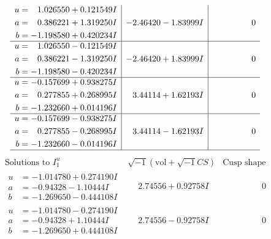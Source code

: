 \documentclass[1p]{elsarticle_modified}
\theoremstyle{definition}
\newcommand{\I}{\sqrt{-1}}
\begin{document}
$$\begin{array}{c|c|c}
\begin{aligned}
u &= \phantom{-}1.026550 + 0.121549 I \\
a &= \phantom{-}0.386221 + 1.319250 I \\
b &= -1.198580 + 0.420234 I\end{aligned}
 & -2.46420 - 1.83999 I & \phantom{-0.000000 } 0 \\ \hline\begin{aligned}
u &= \phantom{-}1.026550 - 0.121549 I \\
a &= \phantom{-}0.386221 - 1.319250 I \\
b &= -1.198580 - 0.420234 I\end{aligned}
 & -2.46420 + 1.83999 I & \phantom{-0.000000 } 0 \\ \hline\begin{aligned}
u &= -0.157699 + 0.938275 I \\
a &= \phantom{-}0.277855 + 0.268995 I \\
b &= -1.232660 + 0.014196 I\end{aligned}
 & \phantom{-}3.44114 + 1.62193 I & \phantom{-0.000000 } 0 \\ \hline\begin{aligned}
u &= -0.157699 - 0.938275 I \\
a &= \phantom{-}0.277855 - 0.268995 I \\
b &= -1.232660 - 0.014196 I\end{aligned}
 & \phantom{-}3.44114 - 1.62193 I & \phantom{-0.000000 } 0\\
 \hline 
 \end{array}$$\newpage$$\begin{array}{c|c|c}  
\text{Solutions to }I^u_{1}& \I (\text{vol} + \sqrt{-1}CS) & \text{Cusp shape}\\
 \hline 
\begin{aligned}
u &= -1.014780 + 0.274190 I \\
a &= -0.94328 - 1.10444 I \\
b &= -1.269650 - 0.444108 I\end{aligned}
 & \phantom{-}2.74556 + 0.92758 I & \phantom{-0.000000 } 0 \\ \hline\begin{aligned}
u &= -1.014780 - 0.274190 I \\
a &= -0.94328 + 1.10444 I \\
b &= -1.269650 + 0.444108 I\end{aligned}
 & \phantom{-}2.74556 - 0.92758 I & \phantom{-0.000000 } 0 \\ \hline\begin{aligned}

\end{aligned}
\end{array}$$
\end{document}
